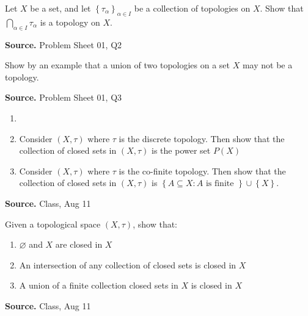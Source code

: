\documentclass[12pt,twoside]{report}
\newenvironment*{source}{\hfill\scriptsize\textbf{Source.}\space}{\par}
\begin{document}
\begin{samepage}
\begin{ex}
Let $X$ be a set, and let $ \left\{ \tau_\alpha \right\}_{ \alpha \in I } $ be a collection of topologies on $X$. 
Show that $ \displaystyle\bigcap_{\alpha \in I} \tau_\alpha $ is a topology on $X$.
\end{ex}
\begin{source}
Problem Sheet 01, Q2
\end{source}
\end{samepage}

\begin{samepage}
\begin{ex}
Show by an example that a union of two topologies on a set $X$ may not be a topology.
\end{ex}
\begin{source}
Problem Sheet 01, Q3
\end{source}
\end{samepage}

\begin{samepage}
\begin{ex}
    \begin{enumerate}
        \item[]
        \item Consider $\left (X, \tau\right )$ where $\tau$ is the discrete topology. Then show that the collection of closed sets in $\left (X, \tau\right )$ is the power set $P\left (X\right )$
        \item Consider $\left (X, \tau\right )$ where $\tau$ is the co-finite topology. Then show that the collection of closed sets in $\left (X, \tau\right )$ is $ \left\{ A \subseteq X  :  A \text{ is finite } \right\} \cup \left\{ X \right\} $.
    \end{enumerate}
\end{ex}
\begin{source}
Class, Aug 11
\end{source}
\end{samepage}

\begin{samepage}
\begin{ex}
 Given a topological space $\left (X, \tau\right )$, show that:
    \begin{enumerate}
        \item $\varnothing$ and $X$ are closed in $X$
        \item An intersection of any collection of closed sets is closed in $X$
        \item A union of a finite collection closed sets in $X$ is closed in $X$
    \end{enumerate}
\end{ex}
\begin{source}
Class, Aug 11
\end{source}
\end{samepage}
\end{document}
